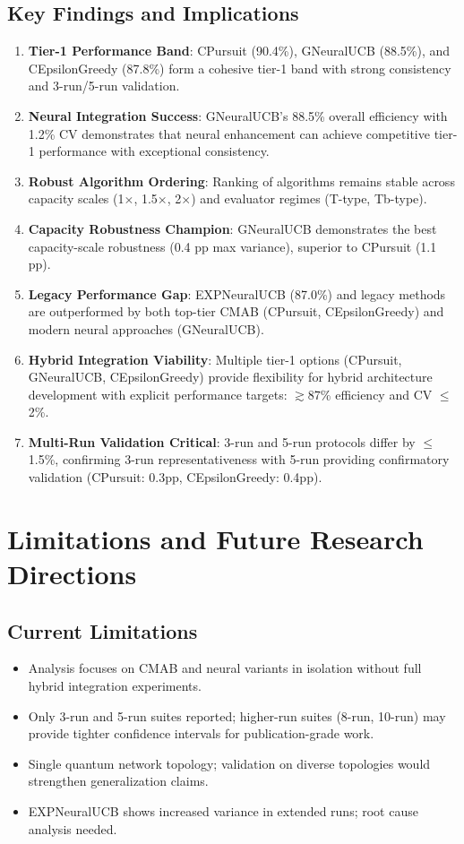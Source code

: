 \documentclass[12pt,a4paper]{article}
\newcommand{\legacy}[1]{\textcolor{legacycolor}{\textbf{#1}}}
\newcommand{\neural}[1]{\textcolor{neuralcolor}{\textbf{#1}}}
\begin{document}
\subsection{Key Findings and Implications}

\begin{enumerate}
\item \textbf{Tier-1 Performance Band}: CPursuit (90.4\%), GNeuralUCB (88.5\%), and CEpsilonGreedy (87.8\%) form a cohesive tier-1 band with strong consistency and 3-run/5-run validation.
\item \neural{Neural Integration Success}: GNeuralUCB's 88.5\% overall efficiency with 1.2\% CV demonstrates that neural enhancement can achieve competitive tier-1 performance with exceptional consistency.
\item \textbf{Robust Algorithm Ordering}: Ranking of algorithms remains stable across capacity scales (1$\times$, 1.5$\times$, 2$\times$) and evaluator regimes (T-type, Tb-type).
\item \neural{Capacity Robustness Champion}: GNeuralUCB demonstrates the best capacity-scale robustness (0.4 pp max variance), superior to CPursuit (1.1 pp).
\item \legacy{Legacy Performance Gap}: EXPNeuralUCB (87.0\%) and legacy methods are outperformed by both top-tier CMAB (CPursuit, CEpsilonGreedy) and modern neural approaches (GNeuralUCB).
\item \textbf{Hybrid Integration Viability}: Multiple tier-1 options (CPursuit, GNeuralUCB, CEpsilonGreedy) provide flexibility for hybrid architecture development with explicit performance targets: $\gtrsim$87\% efficiency and CV $\leq$2\%.
\item \textbf{Multi-Run Validation Critical}: 3-run and 5-run protocols differ by $\leq$1.5\%, confirming 3-run representativeness with 5-run providing confirmatory validation (CPursuit: 0.3pp, CEpsilonGreedy: 0.4pp).
\end{enumerate}

\section{Limitations and Future Research Directions}

\subsection{Current Limitations}

\begin{itemize}
\item Analysis focuses on CMAB and neural variants in isolation without full hybrid integration experiments.
\item Only 3-run and 5-run suites reported; higher-run suites (8-run, 10-run) may provide tighter confidence intervals for publication-grade work.
\item Single quantum network topology; validation on diverse topologies would strengthen generalization claims.
\item EXPNeuralUCB shows increased variance in extended runs; root cause analysis needed.
\end{itemize}
\end{document}
